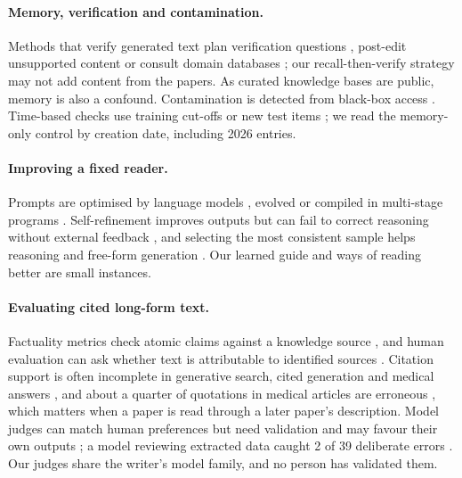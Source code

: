 \documentclass{article} %
\begin{document}
\paragraph{Memory, verification and contamination.}
Methods that verify generated text plan verification questions \citep{dhuliawala2024chainofverification}, post-edit unsupported content \citep{Gao2022RarrResearching} or consult domain databases \citep{wang2025geneagent}; our recall-then-verify strategy may not add content from the papers. As curated knowledge bases are public, memory is also a confound. Contamination is detected from black-box access \citep{Shi2023DetectingPretraining,oren2024proving,golchin2024time,Golchin2025DataContamination}. Time-based checks use training cut-offs \citep{Roberts2023DataContamination} or new test items \citep{Jain2024LivecodebenchHolistic,White2024LivebenchChallenging}; we read the memory-only control by creation date, including 2026 entries.

\paragraph{Improving a fixed reader.}
Prompts are optimised by language models \citep{Zhou2022LargeLanguage,Pryzant2023AutomaticPrompt,Yang2023LargeLanguage}, evolved \citep{Guo2023EvopromptConnecting,Fernando2023PromptbreederSelfreferential,agrawal2026gepa} or compiled in multi-stage programs \citep{Khattab2023DspyCompiling,Opsahlong2024OptimizingInstructions}. Self-refinement improves outputs \citep{Madaan2023SelfrefineIterative} but can fail to correct reasoning without external feedback \citep{Huang2023LargeLanguage}, and selecting the most consistent sample helps reasoning \citep{Wang2022SelfconsistencyImproves} and free-form generation \citep{Chen2023UniversalSelfconsistency}. Our learned guide and ways of reading better are small instances.

\paragraph{Evaluating cited long-form text.}
Factuality metrics check atomic claims against a knowledge source \citep{min2023factscore,wei2024longform,Song2024VeriscoreEvaluating}, and human evaluation can ask whether text is attributable to identified sources \citep{Rashkin2021MeasuringAttribution}. Citation support is often incomplete in generative search, cited generation and medical answers \citep{Liu2023EvaluatingVerifiability,gao2023enabling,wu2025automated}, and about a quarter of quotations in medical articles are erroneous \citep{jergas2015quotation}, which matters when a paper is read through a later paper's description. Model judges can match human preferences \citep{zheng2023judging} but need validation \citep{shankar2024who} and may favour their own outputs \citep{panickssery2024llm}; a model reviewing extracted data caught 2 of 39 deliberate errors \citep{Stewartevans2025ExpeditingData}. Our judges share the writer's model family, and no person has validated them.
\end{document}
